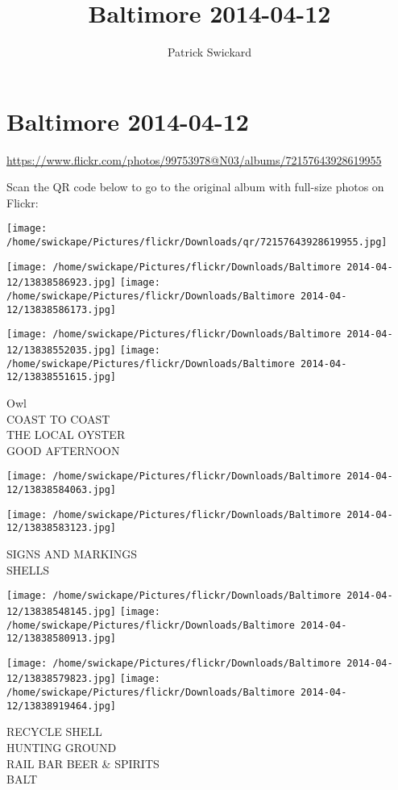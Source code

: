 \documentclass[10pt,letterpaper]{article}
\title{Baltimore 2014-04-12}
\author{Patrick Swickard}
\date{}
\begin{document}
\section*{Baltimore 2014-04-12}

\url{https://www.flickr.com/photos/99753978@N03/albums/72157643928619955}

Scan the QR code below to go to the original album with full-size photos on Flickr:

\texttt{[image: /home/swickape/Pictures/flickr/Downloads/qr/72157643928619955.jpg]}
\pagebreak

\texttt{[image: /home/swickape/Pictures/flickr/Downloads/Baltimore 2014-04-12/13838586923.jpg]}
\texttt{[image: /home/swickape/Pictures/flickr/Downloads/Baltimore 2014-04-12/13838586173.jpg]}

\texttt{[image: /home/swickape/Pictures/flickr/Downloads/Baltimore 2014-04-12/13838552035.jpg]}
\texttt{[image: /home/swickape/Pictures/flickr/Downloads/Baltimore 2014-04-12/13838551615.jpg]}

Owl\\
COAST TO COAST\\
THE LOCAL OYSTER\\
GOOD AFTERNOON
\pagebreak

\texttt{[image: /home/swickape/Pictures/flickr/Downloads/Baltimore 2014-04-12/13838584063.jpg]}

\vspace{0.25in}
\texttt{[image: /home/swickape/Pictures/flickr/Downloads/Baltimore 2014-04-12/13838583123.jpg]}

SIGNS AND MARKINGS\\
SHELLS
\pagebreak

\texttt{[image: /home/swickape/Pictures/flickr/Downloads/Baltimore 2014-04-12/13838548145.jpg]}
\texttt{[image: /home/swickape/Pictures/flickr/Downloads/Baltimore 2014-04-12/13838580913.jpg]}

\texttt{[image: /home/swickape/Pictures/flickr/Downloads/Baltimore 2014-04-12/13838579823.jpg]}
\texttt{[image: /home/swickape/Pictures/flickr/Downloads/Baltimore 2014-04-12/13838919464.jpg]}

RECYCLE SHELL\\
HUNTING GROUND\\
RAIL BAR BEER \& SPIRITS\\
BALT
\pagebreak
\end{document}
